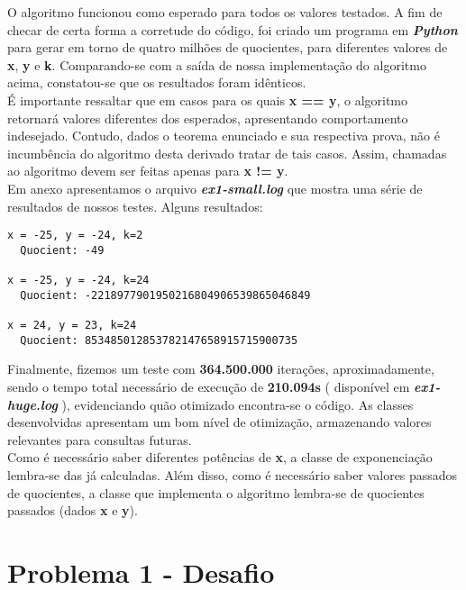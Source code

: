 \documentclass[twoside]{article}
\begin{document}
\begin{multicols}{2}
\indent O algoritmo funcionou como esperado para todos os valores testados. A fim de checar de certa forma a corretude do código, foi criado um programa em \textbf{\textit{Python}} para gerar em torno de quatro milhões de quocientes, para diferentes valores de \textbf{x}, \textbf{y} e \textbf{k}. Comparando-se com a saída de nossa implementação do algoritmo acima, constatou-se que os resultados foram idênticos.\\

\indent É importante ressaltar que em casos para os quais \textbf{x == y}, o algoritmo retornará valores diferentes dos esperados, apresentando comportamento indesejado. Contudo, dados o teorema enunciado e sua respectiva prova, não é incumbência do algoritmo desta derivado tratar de tais casos. Assim, chamadas ao algoritmo devem ser feitas apenas para \textbf{x != y}.\\

\indent Em anexo apresentamos o arquivo \textbf{\textit{ex1-small.log}} que mostra uma série de resultados de nossos testes. Alguns resultados:\\

\begin{lstlisting}
x = -25, y = -24, k=2
  Quocient: -49

x = -25, y = -24, k=24
  Quocient: -2218977901950216804906539865046849

x = 24, y = 23, k=24
  Quocient: 853485012853782147658915715900735

\end{lstlisting}

\indent Finalmente, fizemos um teste com \textbf{364.500.000} iterações, aproximadamente, sendo o tempo total necessário de execução de \textbf{210.094s} ( disponível em \textbf{\textit{ex1-huge.log}} ), evidenciando quão otimizado encontra-se o código. As classes desenvolvidas apresentam um bom nível de otimização, armazenando valores relevantes para consultas futuras.\\

\indent Como é necessário saber diferentes potências de \textbf{x}, a classe de exponenciação lembra-se das já calculadas. Além disso, como é necessário saber valores passados de quocientes, a classe que implementa o algoritmo lembra-se de quocientes passados (dados \textbf{x} e \textbf{y}).



\newpage
\section{Problema 1 - Desafio}


\end{multicols}
\end{document}
